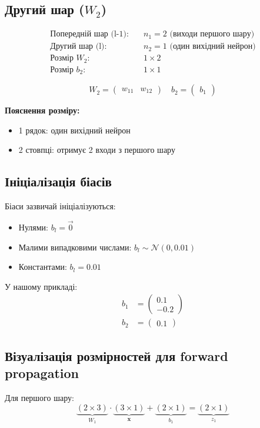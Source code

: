 \documentclass{article}
\begin{document}
\subsection{Другий шар ($W_2$)}
\begin{align*}
\text{Попередній шар (l-1):} & \quad n_1 = 2 \text{ (виходи першого шару)} \\
\text{Другий шар (l):} & \quad n_2 = 1 \text{ (один вихідний нейрон)} \\
\text{Розмір } W_2: & \quad 1 \times 2 \\
\text{Розмір } b_2: & \quad 1 \times 1
\end{align*}

\[W_2 = \begin{pmatrix} w_{11} & w_{12} \end{pmatrix} \quad b_2 = \begin{pmatrix} b_1 \end{pmatrix}\]

\textbf{Пояснення розміру:}
\begin{itemize}
    \item 1 рядок: один вихідний нейрон
    \item 2 стовпці: отримує 2 входи з першого шару
\end{itemize}

\subsection{Ініціалізація біасів}
Біаси зазвичай ініціалізуються:
\begin{itemize}
    \item Нулями: $b_l = \vec{0}$
    \item Малими випадковими числами: $b_l \sim \mathcal{N}(0, 0.01)$
    \item Константами: $b_l = 0.01$
\end{itemize}

У нашому прикладі:
\begin{align*}
b_1 &= \begin{pmatrix} 0.1 \\ -0.2 \end{pmatrix} \\
b_2 &= \begin{pmatrix} 0.1 \end{pmatrix}
\end{align*}

\subsection{Візуалізація розмірностей для forward propagation}
Для першого шару:
\[\underbrace{(2 \times 3)}_{W_1} \cdot \underbrace{(3 \times 1)}_{\mathbf{x}} + \underbrace{(2 \times 1)}_{b_1} = \underbrace{(2 \times 1)}_{z_1}\]
\end{document}
